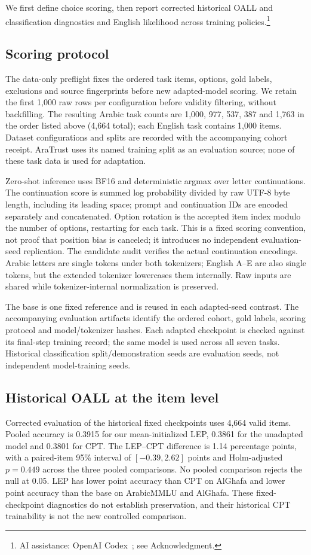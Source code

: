 \documentclass{ieeeaccess}
\begin{document}
We first define choice scoring, then report corrected historical OALL and
classification diagnostics and English likelihood across training policies.\footnote{AI assistance: OpenAI Codex~\cite{openaicodex2026}; see Acknowledgment.}

\subsection*{Scoring protocol}
The data-only preflight fixes the ordered task items, options, gold labels, exclusions and source fingerprints before new adapted-model scoring. We retain the first 1{,}000 raw rows per configuration before validity filtering, without backfilling. The resulting Arabic task counts are 1{,}000, 977, 537, 387 and 1{,}763 in the order listed above (4{,}664 total); each English task contains 1{,}000 items. Dataset configurations and splits are recorded with the accompanying cohort receipt. AraTrust uses its named training split as an evaluation source; none of these task data is used for adaptation.

Zero-shot inference uses BF16 and deterministic argmax over letter continuations. The continuation score is summed log probability divided by raw UTF-8 byte length, including its leading space; prompt and continuation IDs are encoded separately and concatenated. Option rotation is the accepted item index modulo the number of options, restarting for each task. This is a fixed scoring convention, not proof that position bias is canceled; it introduces no independent evaluation-seed replication. The candidate audit verifies the actual continuation encodings. Arabic letters are single tokens under both tokenizers; English A--E are also single tokens, but the extended tokenizer lowercases them internally. Raw inputs are shared while tokenizer-internal normalization is preserved.

The base is one fixed reference and is reused in each adapted-seed contrast. The accompanying evaluation artifacts identify the ordered cohort, gold labels, scoring protocol and model/tokenizer hashes. Each adapted checkpoint is checked against its final-step training record; the same model is used across all seven tasks. Historical classification split/demonstration seeds are evaluation seeds, not independent model-training seeds.

\subsection*{Historical OALL at the item level}
Corrected evaluation of the historical fixed checkpoints uses 4{,}664
valid items. Pooled accuracy is 0.3915 for our mean-initialized LEP, 0.3861
for the unadapted model and 0.3801 for CPT. The LEP--CPT difference is
1.14 percentage points, with a paired-item 95\% interval of
$[-0.39,2.62]$ points and Holm-adjusted $p=0.449$ across the three
pooled comparisons. No pooled comparison rejects the null at 0.05.
LEP has lower point accuracy than CPT on AlGhafa and lower point accuracy
than the base on ArabicMMLU and AlGhafa. These fixed-checkpoint diagnostics
do not establish preservation, and their historical CPT trainability
is not the new controlled comparison.
\end{document}

